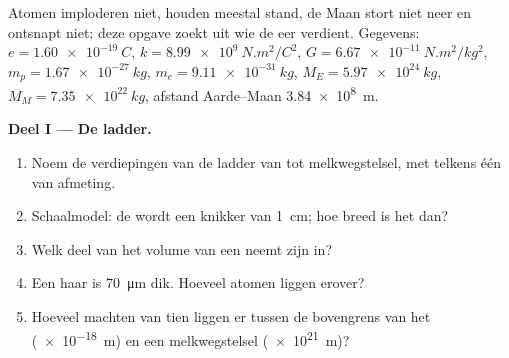 \begin{problem}
\label{pb:g11:fundamental-interactions:1}
Atomen imploderen niet,  houden meestal stand, de Maan stort niet
neer en ontsnapt niet; deze opgave zoekt uit wie de eer verdient.
Gegevens: $e = \qty{1.60e-19}{C}$, $k = \qty{8.99e9}{N.m^2/C^2}$,
$G = \qty{6.67e-11}{N.m^2/kg^2}$, $m_p = \qty{1.67e-27}{kg}$,
$m_e = \qty{9.11e-31}{kg}$, $M_E = \qty{5.97e24}{kg}$,
$M_M = \qty{7.35e22}{kg}$, afstand Aarde--Maan \qty{3.84e8}{m}.

\medskip
\noindent\textbf{Deel I --- De ladder.}
\begin{enumerate}
  \item Noem de verdiepingen van de ladder van  tot melkwegstelsel,
        met telkens één  van afmeting.
  \item Schaalmodel: de  wordt een knikker van \qty{1}{cm}; hoe breed
        is het  dan?
  \item Welk deel van het volume van een  neemt zijn  in?
  \item Een haar is \qty{70}{\micro m} dik. Hoeveel atomen liggen erover?
  \item Hoeveel machten van tien liggen er tussen de bovengrens van het
         (\qty{e-18}{m}) en een melkwegstelsel (\qty{e21}{m})?
\end{enumerate}


\end{problem}
